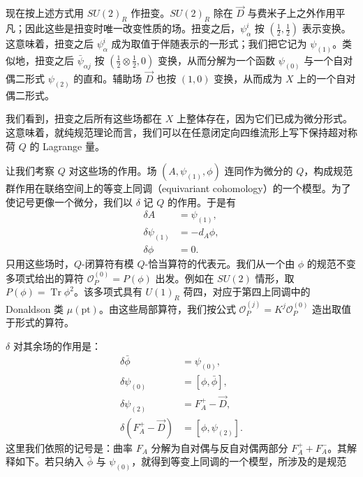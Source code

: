 现在按上述方式用 $SU(2)_R$ 作扭变。$SU(2)_R$ 除在 $\vec D$ 与费米子上之外作用平凡；因此这些是扭变时唯一改变性质的场。扭变之后，$\psi^i_\alpha$ 按 $(\frac12,\frac12)$ 表示变换。这意味着，扭变之后 $\psi^i_\alpha$ 成为取值于伴随表示的一形式；我们把它记为 $\psi_{(1)}$。类似地，扭变之后 $\bar\psi_{\alpha j}$ 按 $(\frac12\otimes\frac12,0)$ 变换，从而分解为一个函数 $\psi_{(0)}$ 与一个自对偶二形式 $\psi_{(2)}$ 的直和。辅助场 $\vec D$ 也按 $(1,0)$ 变换，从而成为 $X$ 上的一个自对偶二形式。

我们看到，扭变之后所有这些场都在 $X$ 上整体存在，因为它们已成为微分形式。这意味着，就纯规范理论而言，我们可以在任意闭定向四维流形上写下保持超对称荷 $Q$ 的 Lagrange 量。


让我们考察 $Q$ 对这些场的作用。场 $(A,\psi_{(1)},\phi)$ 连同作为微分的 $Q$，构成规范群作用在联络空间上的等变上同调（equivariant cohomology）的一个模型。为了使记号更像一个微分，我们以 $\delta$ 记 $Q$ 的作用。于是有
\[
\begin{aligned}
\delta A&=\psi_{(1)},\\
\delta\psi_{(1)}&=-d_A\phi,\\
\delta\phi&=0.
\end{aligned}
\]
只用这些场时，$Q$-闭算符有模 $Q$-恰当算符的代表元。我们从一个由 $\phi$ 的规范不变多项式给出的算符 $\mathcal{O}_P^{(0)}=P(\phi)$ 出发。例如在 $SU(2)$ 情形，取 $P(\phi)=\operatorname{Tr}\phi^2$。该多项式具有 $U(1)_R$ 荷四，对应于第四上同调中的 Donaldson 类 $\mu(\text{pt})$。由这些局部算符，我们按公式 $\mathcal{O}_P^{(j)}=K^j\mathcal{O}_P^{(0)}$ 造出取值于形式的算符。

$\delta$ 对其余场的作用是：
\[
\begin{aligned}
\delta\bar\phi&=\psi_{(0)},\\
\delta\psi_{(0)}&=[\phi,\bar\phi],\\
\delta\psi_{(2)}&=F_A^+-\vec D,\\
\delta(F_A^+-\vec D)&=[\phi,\psi_{(2)}].
\end{aligned}
\]
这里我们依照的记号是：曲率 $F_A$ 分解为自对偶与反自对偶两部分 $F_A^++F_A^-$。其解释如下。若只纳入 $\bar\phi$ 与 $\psi_{(0)}$，就得到等变上同调的一个模型，所涉及的是规范

